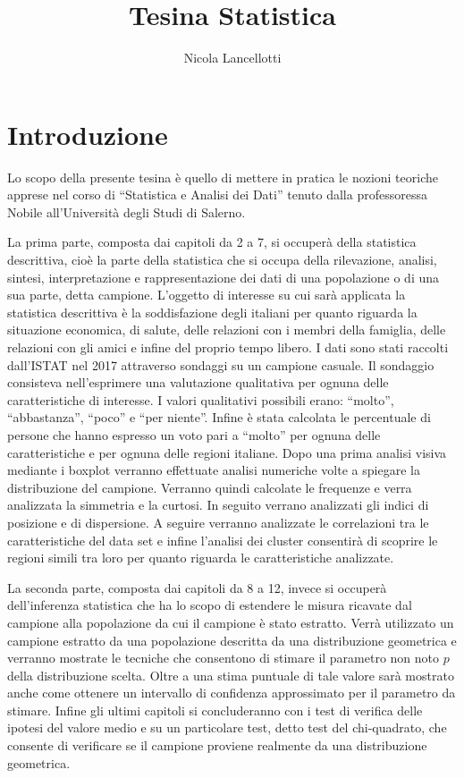 \documentclass[]{book}
\title{Tesina Statistica}
\author{Nicola Lancellotti}
\date{}
\begin{document}
\maketitle

{
\setcounter{tocdepth}{1}
\tableofcontents
}
\chapter{Introduzione}\label{introduzione}

Lo scopo della presente tesina è quello di mettere in pratica le nozioni
teoriche apprese nel corso di ``Statistica e Analisi dei Dati''
\citep{sad} tenuto dalla professoressa Nobile all'Università degli Studi
di Salerno.

La prima parte, composta dai capitoli da 2 a 7, si occuperà della
statistica descrittiva, cioè la parte della statistica che si occupa
della rilevazione, analisi, sintesi, interpretazione e rappresentazione
dei dati di una popolazione o di una sua parte, detta campione.
L'oggetto di interesse su cui sarà applicata la statistica descrittiva è
la soddisfazione degli italiani per quanto riguarda la situazione
economica, di salute, delle relazioni con i membri della famiglia, delle
relazioni con gli amici e infine del proprio tempo libero. I dati sono
stati raccolti dall'ISTAT nel 2017 attraverso sondaggi su un campione
casuale. Il sondaggio consisteva nell'esprimere una valutazione
qualitativa per ognuna delle caratteristiche di interesse. I valori
qualitativi possibili erano: ``molto'', ``abbastanza'', ``poco'' e ``per
niente''. Infine è stata calcolata le percentuale di persone che hanno
espresso un voto pari a ``molto'' per ognuna delle caratteristiche e per
ognuna delle regioni italiane. Dopo una prima analisi visiva mediante i
boxplot verranno effettuate analisi numeriche volte a spiegare la
distribuzione del campione. Verranno quindi calcolate le frequenze e
verra analizzata la simmetria e la curtosi. In seguito verrano
analizzati gli indici di posizione e di dispersione. A seguire verranno
analizzate le correlazioni tra le caratteristiche del data set e infine
l'analisi dei cluster consentirà di scoprire le regioni simili tra loro
per quanto riguarda le caratteristiche analizzate.

La seconda parte, composta dai capitoli da 8 a 12, invece si occuperà
dell'inferenza statistica che ha lo scopo di estendere le misura
ricavate dal campione alla popolazione da cui il campione è stato
estratto. Verrà utilizzato un campione estratto da una popolazione
descritta da una distribuzione geometrica e verranno mostrate le
tecniche che consentono di stimare il parametro non noto \(p\) della
distribuzione scelta. Oltre a una stima puntuale di tale valore sarà
mostrato anche come ottenere un intervallo di confidenza approssimato
per il parametro da stimare. Infine gli ultimi capitoli si concluderanno
con i test di verifica delle ipotesi del valore medio e su un
particolare test, detto test del chi-quadrato, che consente di
verificare se il campione proviene realmente da una distribuzione
geometrica.
\end{document}
